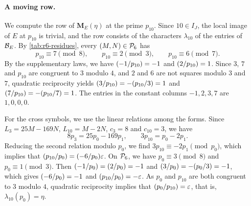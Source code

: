 \paragraph{A moving row.} We compute the row of $\mathbf M_E(\eta)$ at the prime $p_{10}$. Since $10\in I_J$, the local image of $E$ at $p_{10}$ is trivial, and the row consists of the characters $\lambda_{10}$ of the entries of $\mathcal B_E$. By \cref{tab:r6-residues}, every $(M,N)\in\mathcal P_6$ has
\begin{equation*}
p_{10}\equiv7\pmod8,\qquad p_{10}\equiv2\pmod3,\qquad p_{10}\equiv6\pmod7.
\end{equation*}
By the supplementary laws, we have $\leg{-1}{p_{10}}=-1$ and $\leg2{p_{10}}=1$. Since $3$, $7$ and $p_{10}$ are congruent to $3$ modulo $4$, and $2$ and $6$ are not squares modulo $3$ and $7$, quadratic reciprocity yields $\leg3{p_{10}}=-\leg{p_{10}}3=1$ and $\leg7{p_{10}}=-\leg{p_{10}}7=1$. The entries in the constant columns $-1,2,3,7$ are $1,0,0,0$.

For the cross symbols, we use the linear relations among the forms. Since $L_3=25M-169N$, $L_{10}=M-2N$, $c_3=8$ and $c_{10}=3$, we have
\begin{equation*}
8p_3=25p_0-169p_1,\qquad 3p_{10}=p_0-2p_1.
\end{equation*}
Reducing the second relation modulo $p_0$, we find $3p_{10}\equiv-2p_1\pmod{p_0}$, which implies that $\leg{p_{10}}{p_0}=\leg{-6}{p_0}\eps$. On $\mathcal P_6$, we have $p_0\equiv3\pmod8$ and $p_0\equiv1\pmod3$. Then $\leg{-1}{p_0}=\leg2{p_0}=-1$ and $\leg3{p_0}=-\leg{p_0}3=-1$, which gives $\leg{-6}{p_0}=-1$ and $\leg{p_{10}}{p_0}=-\eps$. As $p_0$ and $p_{10}$ are both congruent to $3$ modulo $4$, quadratic reciprocity implies that $\leg{p_0}{p_{10}}=\eps$, that is, $\lambda_{10}(p_0)=\eta$.

